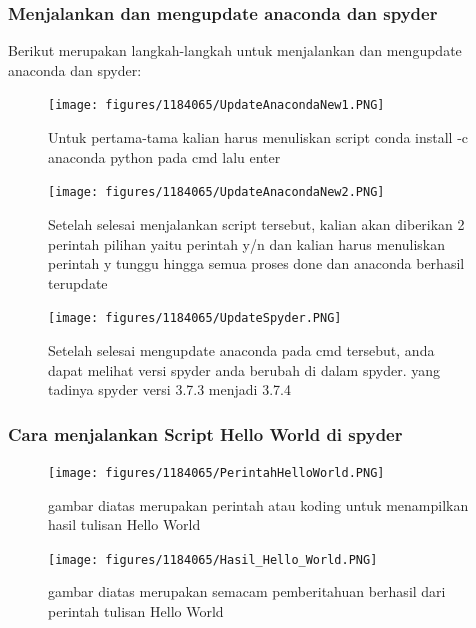 \subsubsection{Menjalankan dan mengupdate anaconda dan spyder}
Berikut merupakan langkah-langkah untuk menjalankan dan mengupdate anaconda dan spyder:
\begin{figure}[H]
		\texttt{[image: figures/1184065/UpdateAnacondaNew1.PNG]}
		\centering
		\caption{Untuk pertama-tama kalian harus menuliskan script conda install -c anaconda python pada cmd lalu enter}
	\end{figure}
	\begin{figure}[H]
		\texttt{[image: figures/1184065/UpdateAnacondaNew2.PNG]}
		\centering
		\caption{Setelah selesai menjalankan script tersebut, kalian akan diberikan 2 perintah pilihan yaitu perintah y/n dan kalian harus menuliskan perintah y tunggu hingga semua proses done dan anaconda berhasil terupdate}
	\end{figure}
	\begin{figure}[H]
		\texttt{[image: figures/1184065/UpdateSpyder.PNG]}
		\centering
		\caption{Setelah selesai mengupdate anaconda pada cmd tersebut, anda dapat melihat versi spyder anda berubah di dalam spyder. yang tadinya spyder versi 3.7.3 menjadi 3.7.4}
	\end{figure}
	
\subsubsection{Cara menjalankan Script Hello World di spyder}
\begin{figure}[H]
		\texttt{[image: figures/1184065/PerintahHelloWorld.PNG]}
		\centering
		\caption{gambar diatas merupakan perintah atau koding untuk menampilkan hasil tulisan Hello World }
	\end{figure}
\begin{figure}[H]
		\texttt{[image: figures/1184065/Hasil\_Hello\_World.PNG]}
		\centering
		\caption{gambar diatas merupakan semacam pemberitahuan berhasil dari perintah tulisan Hello World }
	\end{figure}

